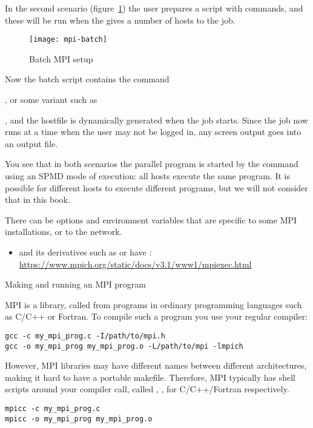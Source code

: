 In the second scenario (figure~\ref{fig:mpi-batch}) the user prepares
a  script with commands, and these will be
run when the  gives a number of hosts
to the job.
\begin{figure}[ht]
  \texttt{[image: mpi-batch]}
  \caption{Batch MPI setup}
  \label{fig:mpi-batch}
\end{figure}
Now the batch script contains the  command%
\begin{istc}
, or some variant such as %
\end{istc}
, and the hostfile is dynamically generated when the job starts.
Since the job now runs at a time when the user may not be logged in, 
any screen output goes into an output file.

You see that in both scenarios the parallel program is started
by the  command using
an \ac{SPMD} mode of execution: all hosts execute the same program.
It is possible for different hosts to execute different programs,
but we will not consider that in this book.

There can be options and environment variables that are specific to
some MPI installations, or to the network.
\begin{itemize}
\item {} and its derivatives such as
   or  have
  :
  \url{https://www.mpich.org/static/docs/v3.1/www1/mpiexec.html}
\end{itemize}

 {Making and running an MPI program}

MPI is a library, called from programs in ordinary programming languages
such as C/C++ or Fortran. To compile such a program you use your regular
compiler:
\begin{verbatim}
gcc -c my_mpi_prog.c -I/path/to/mpi.h
gcc -o my_mpi_prog my_mpi_prog.o -L/path/to/mpi -lmpich
\end{verbatim}
However, MPI libraries may have different names between different
architectures, making it hard to have a portable makefile. Therefore,
MPI typically has shell scripts around your compiler call,
called , , 
for C/C++/Fortran respectively.
\begin{verbatim}
mpicc -c my_mpi_prog.c
mpicc -o my_mpi_prog my_mpi_prog.o
\end{verbatim}

